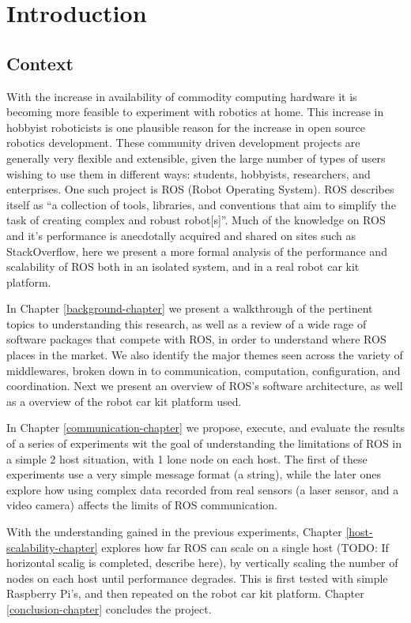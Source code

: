 \documentclass[../dissertation.tex]{subfiles}
\begin{document}
\chapter{Introduction}
\label{introduction-chapter}

\section{Context}

With the increase in availability of commodity computing hardware it is becoming more feasible to experiment with robotics at home. This increase in hobbyist roboticists is one plausible reason for the increase in open source robotics development. These community driven development projects are generally very flexible and extensible, given the large number of types of users wishing to use them in different ways: students, hobbyists, researchers, and enterprises. One such project is ROS (Robot Operating System). ROS describes itself as ``a collection of tools, libraries, and conventions that aim to simplify the task of creating complex and robust robot[s]''\cite{rosaboutpage}. Much of the knowledge on ROS and it's performance is anecdotally acquired and shared on sites such as StackOverflow, here we present a more formal analysis of the performance and scalability of ROS both in an isolated system, and in a real robot car kit platform.

In Chapter \ref{background-chapter} we present a walkthrough of the pertinent topics to understanding this research, as well as a review of a wide rage of software packages that compete with ROS, in order to understand where ROS places in the market. We also identify the major themes seen across the variety of middlewares, broken down in to communication, computation, configuration, and coordination. Next we present an overview of ROS's software architecture, as well as a overview of the robot car kit platform used.

In Chapter \ref{communication-chapter} we propose, execute, and evaluate the results of a series of experiments wit the goal of understanding the limitations of ROS in a simple 2 host situation, with 1 lone node on each host. The first of these experiments use a very simple message format (a string), while the later ones explore how using complex data recorded from real sensors (a laser sensor, and a video camera) affects the limits of ROS communication.

With the understanding gained in the previous experiments, Chapter \ref{host-scalability-chapter} explores how far ROS can scale on a single host (TODO: If horizontal scalig is completed, describe here), by vertically scaling the number of nodes on each host until performance degrades. This is first tested with simple Raspberry Pi's, and then repeated on the robot car kit platform. Chapter \ref{conclusion-chapter} concludes the project.
\end{document}
